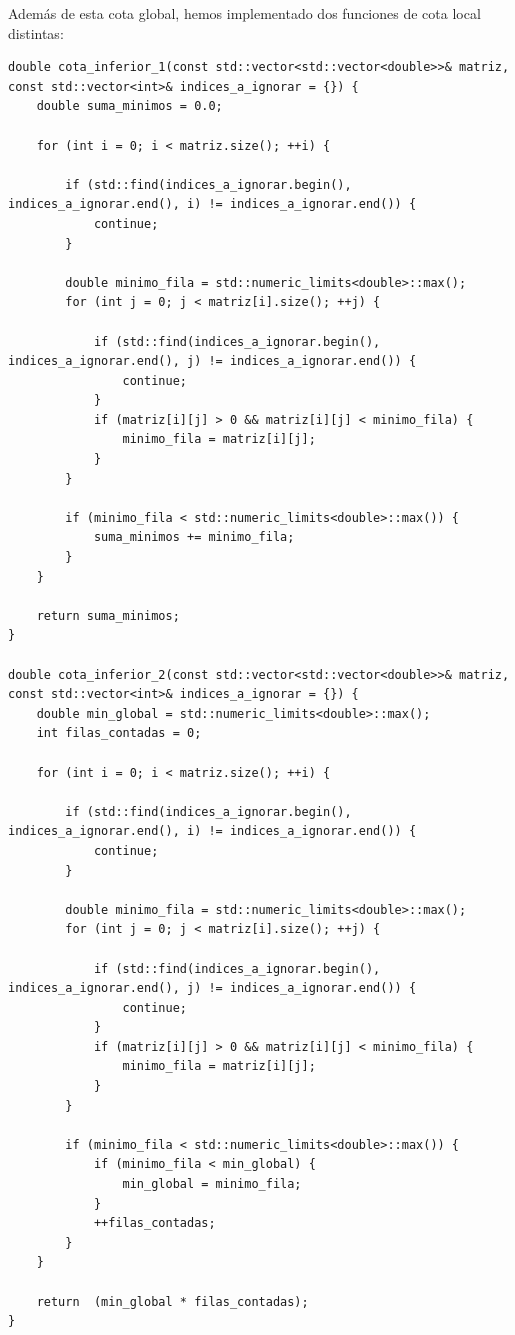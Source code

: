 \documentclass[11pt,openany]{book}
\begin{document}
Además de esta cota global, hemos implementado dos funciones de cota local distintas:
\\ 
\begin{lstlisting}
double cota_inferior_1(const std::vector<std::vector<double>>& matriz, const std::vector<int>& indices_a_ignorar = {}) {
    double suma_minimos = 0.0;

    for (int i = 0; i < matriz.size(); ++i) {
        
        if (std::find(indices_a_ignorar.begin(), indices_a_ignorar.end(), i) != indices_a_ignorar.end()) {
            continue;
        }

        double minimo_fila = std::numeric_limits<double>::max();
        for (int j = 0; j < matriz[i].size(); ++j) {
            
            if (std::find(indices_a_ignorar.begin(), indices_a_ignorar.end(), j) != indices_a_ignorar.end()) {
                continue;
            }
            if (matriz[i][j] > 0 && matriz[i][j] < minimo_fila) {
                minimo_fila = matriz[i][j];
            }
        }

        if (minimo_fila < std::numeric_limits<double>::max()) {
            suma_minimos += minimo_fila;
        }
    }

    return suma_minimos;
}    

double cota_inferior_2(const std::vector<std::vector<double>>& matriz, const std::vector<int>& indices_a_ignorar = {}) {
    double min_global = std::numeric_limits<double>::max();
    int filas_contadas = 0;

    for (int i = 0; i < matriz.size(); ++i) {
        
        if (std::find(indices_a_ignorar.begin(), indices_a_ignorar.end(), i) != indices_a_ignorar.end()) {
            continue;
        }

        double minimo_fila = std::numeric_limits<double>::max();
        for (int j = 0; j < matriz[i].size(); ++j) {
            
            if (std::find(indices_a_ignorar.begin(), indices_a_ignorar.end(), j) != indices_a_ignorar.end()) {
                continue;
            }
            if (matriz[i][j] > 0 && matriz[i][j] < minimo_fila) {
                minimo_fila = matriz[i][j];
            }
        }

        if (minimo_fila < std::numeric_limits<double>::max()) {
            if (minimo_fila < min_global) {
                min_global = minimo_fila;
            }
            ++filas_contadas;
        }
    }

    return  (min_global * filas_contadas);
}
            
\end{lstlisting}
\end{document}
